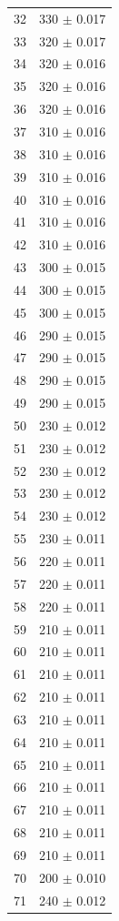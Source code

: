 \documentclass[a4paper]{instrumentacao}
\begin{document}
\begin{longtable}{cc}
 32 & 330 $\pm$ 0.017 \\
 33 & 320 $\pm$ 0.017 \\
 34 & 320 $\pm$ 0.016 \\
 35 & 320 $\pm$ 0.016 \\
 36 & 320 $\pm$ 0.016 \\
 37 & 310 $\pm$ 0.016 \\
 38 & 310 $\pm$ 0.016 \\
 39 & 310 $\pm$ 0.016 \\
 40 & 310 $\pm$ 0.016 \\
 41 & 310 $\pm$ 0.016 \\
 42 & 310 $\pm$ 0.016 \\
 43 & 300 $\pm$ 0.015 \\
 44 & 300 $\pm$ 0.015 \\
 45 & 300 $\pm$ 0.015 \\
 46 & 290 $\pm$ 0.015 \\
 47 & 290 $\pm$ 0.015 \\
 48 & 290 $\pm$ 0.015 \\
 49 & 290 $\pm$ 0.015 \\
 50 & 230 $\pm$ 0.012 \\
 51 & 230 $\pm$ 0.012 \\
 52 & 230 $\pm$ 0.012 \\
 53 & 230 $\pm$ 0.012 \\
 54 & 230 $\pm$ 0.012 \\
 55 & 230 $\pm$ 0.011 \\
 56 & 220 $\pm$ 0.011 \\
 57 & 220 $\pm$ 0.011 \\
 58 & 220 $\pm$ 0.011 \\
 59 & 210 $\pm$ 0.011 \\
 60 & 210 $\pm$ 0.011 \\
 61 & 210 $\pm$ 0.011 \\
 62 & 210 $\pm$ 0.011 \\
 63 & 210 $\pm$ 0.011 \\
 64 & 210 $\pm$ 0.011 \\
 65 & 210 $\pm$ 0.011 \\
 66 & 210 $\pm$ 0.011 \\
 67 & 210 $\pm$ 0.011 \\
 68 & 210 $\pm$ 0.011 \\
 69 & 210 $\pm$ 0.011 \\
 70 & 200 $\pm$ 0.010 \\
 71 & 240 $\pm$ 0.012 \\

\end{longtable}
\end{document}

